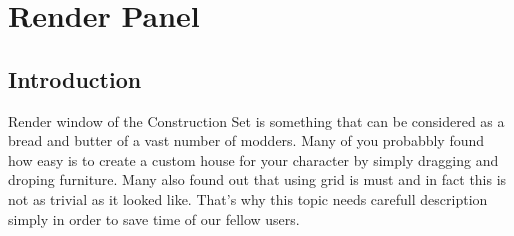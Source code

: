 \section{Render Panel}

\subsection{Introduction}
Render window of the \BS{} Construction Set is something that can be considered as a bread and butter of a vast number of modders. Many of you probabbly found how easy is to create a custom house for your character by simply dragging and droping furniture. Many also found out that using grid is must and in fact this is not as trivial as it looked like. That's why this topic needs carefull description simply in order to save time of our fellow users.

